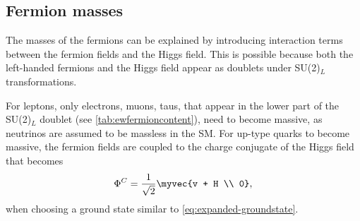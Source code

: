 




\subsection{Fermion masses}
\label{subsec:fermion-masses}
The masses of the fermions can be explained by introducing interaction terms between the fermion fields and the Higgs field. 
This is possible because both the left-handed fermions and the Higgs field appear as doublets under SU(2)$_L$ transformations.

For leptons, only electrons, muons, taus, that appear in the lower part of the SU(2)$_L$ doublet (see \cref{tab:ewfermioncontent}), need to become massive, as neutrinos are assumed to be massless in the SM.
For up-type quarks to become massive, the fermion fields are coupled to the charge conjugate of the Higgs field that becomes
\begin{equation}
  \Phi^C = \frac{1}{\sqrt{2}} \myvec{v + H \\ 0},
\end{equation}
when choosing a ground state similar to \cref{eq:expanded-groundstate}.

